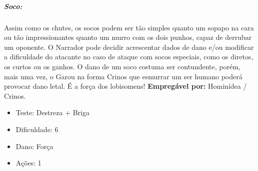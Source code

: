 \subparagraph{\bf Soco:}
Assim como os chutes, os socos podem ser tão simples quanto um sopapo na cara ou tão impressionantes quanto um murro com os dois punhos, capaz de derrubar um oponente. O Narrador pode decidir acrescentar dados de dano e/ou modificar a dificuldade do atacante no caso de ataque com socos especiais, como os diretos, os curtos ou os ganhos.
O dano de um soco costuma ser contundente, porém, mais uma vez, o Garou na forma Crinos que esmurrar um ser humano poderá provocar dano letal. É a força dos lobisomens!
{\bf Empregável por:} Hominídea / Crinos.
\begin{itemize}[noitemsep]
\item Teste: Destreza + Briga
\item Dificuldade: 6
\item Dano: Força
\item Ações: 1
\end{itemize}